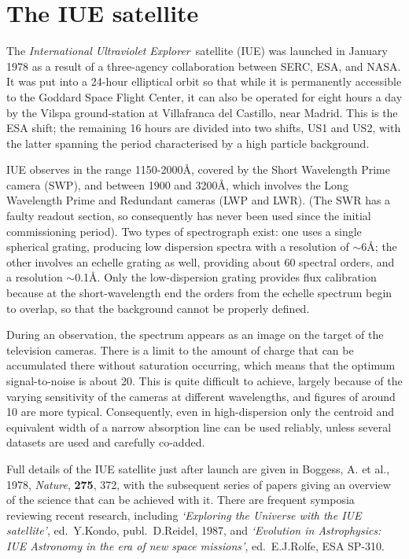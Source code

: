 \section{The IUE satellite}

The {\it International Ultraviolet Explorer}\, satellite (IUE) was launched in
January 1978 as a result of a three-agency collaboration between SERC, ESA,
and NASA. It was put into a 24-hour elliptical orbit so that while it is 
permanently accessible to the Goddard Space Flight Center, it can also be
operated for eight hours a day by the Vilspa ground-station at Villafranca 
del Castillo, near Madrid. This is the ESA shift; the remaining 16 hours are
divided into two shifts, US1 and US2, with the latter spanning the period 
characterised by a high particle background. 

IUE observes in the range 1150-2000{\AA}, covered by the Short Wavelength Prime
camera (SWP), and between 1900 and 3200{\AA}, which involves the Long 
Wavelength Prime and Redundant cameras (LWP and LWR). (The SWR has a faulty 
readout section, so consequently has never been used since the initial 
commissioning period). Two types of spectrograph exist: one uses a single 
spherical grating, producing low dispersion spectra with a resolution of
$\sim$6{\AA}; the other involves an echelle grating as well, providing about 
60 spectral orders, and a resolution $\sim$0.1{\AA}. Only the low-dispersion 
grating provides flux calibration because at the short-wavelength 
end the orders from the echelle spectrum begin to overlap, so that the 
background cannot be properly defined. 

During an observation, the spectrum appears as an image on the target of the 
television cameras. There is a limit to the amount of charge that can be 
accumulated there without saturation occurring, which means that the optimum
signal-to-noise is about 20. This is quite difficult to 
achieve, largely because of the varying sensitivity of the cameras at different
wavelengths, and figures of around 10 are more typical. Consequently, even 
in high-dispersion only the centroid and equivalent width of a 
narrow absorption line can be used reliably, unless several datasets are 
used and carefully co-added. 

Full details of the IUE satellite just after launch are given in 
Boggess, A. et al., 1978, {\it Nature}, {\bf 275}, 372, with the subsequent
series of papers giving an overview of the science that can be achieved with 
it. There are frequent symposia reviewing recent research, including 
{\em `Exploring the Universe with the IUE satellite'}, ed.\ Y.Kondo,
publ.\ D.Reidel, 1987, and {\em `Evolution in Astrophysics: IUE Astronomy in
the era of new space missions'}, ed.\ E.J.Rolfe, ESA SP-310.

